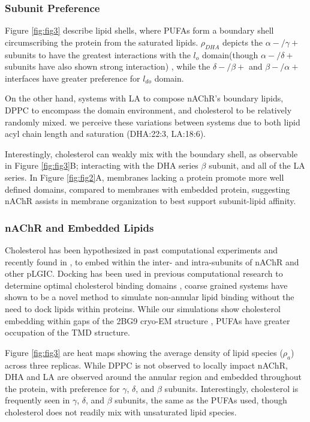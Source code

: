 	\subsubsection {Subunit Preference} \label{Subunit} 

	Figure \ref{fig:fig3} describe lipid shells, where PUFAs form a boundary shell circumscribing the protein from the saturated lipids. $\rho_{DHA}$ depicts the $\alpha-/\gamma+$ subunits to have the greatest interactions with the $l_o$ domain(though $\alpha-/\delta+$ subunits have also shown strong interaction) , while the $\delta-/\beta+$ and $\beta-/\alpha+$ interfaces have greater preference for $l_{do}$ domain. 

	On the other hand, systems with LA to compose nAChR's boundary lipids, DPPC to encompass the domain environment, and cholesterol to be relatively randomly mixed. we perceive these variations between systems due to both lipid acyl chain length and saturation (DHA:22:3, LA:18:6).

	Interestingly, cholesterol can weakly mix with the boundary shell, as observable in Figure \ref{fig:fig3}B; interacting with the DHA series $\beta$ subunit, and all of the LA series. In Figure \ref{fig:fig2}A, membranes lacking a protein promote more well defined domains, compared to membranes with embedded protein, suggesting nAChR assists in membrane organization to best support subunit-lipid affinity.

	\subsubsection{nAChR and Embedded Lipids} \label{Embed}

	Cholesterol has been hypothesized in past computational experiments \cite{Hnin_A_2014,Brannigan_Embedded_2008} and recently found in \cite{Laverty2017}, to embed within the inter- and intra-subunits of nAChR and other pLGIC. Docking has been used in previous computational research to determine optimal cholesterol binding domains \cite{Hnin_A_2014,Brannigan_Embedded_2008}, coarse grained systems have shown to be a novel method to simulate non-annular lipid binding without the need to dock lipids within proteins. While our simulations show cholesterol embedding within gaps \cite{Brannigan_Embedded_2008} of the 2BG9 cryo-EM structure \cite{Unwin_Refined_2005}, PUFAs have greater occupation of the TMD structure.

	Figure \ref{fig:fig3} are heat maps showing the average density of lipid species ($\rho_a$) across three replicas. While DPPC is not observed to locally impact nAChR, DHA and LA are observed around the annular region and embedded throughout the protein, with preference for $\gamma$, $\delta$, and $\beta$ subunits. Interestingly, cholesterol is frequently seen in $\gamma$, $\delta$, and $\beta$ subunits, the same as the PUFAs used, though cholesterol does not readily mix with unsaturated lipid species.

